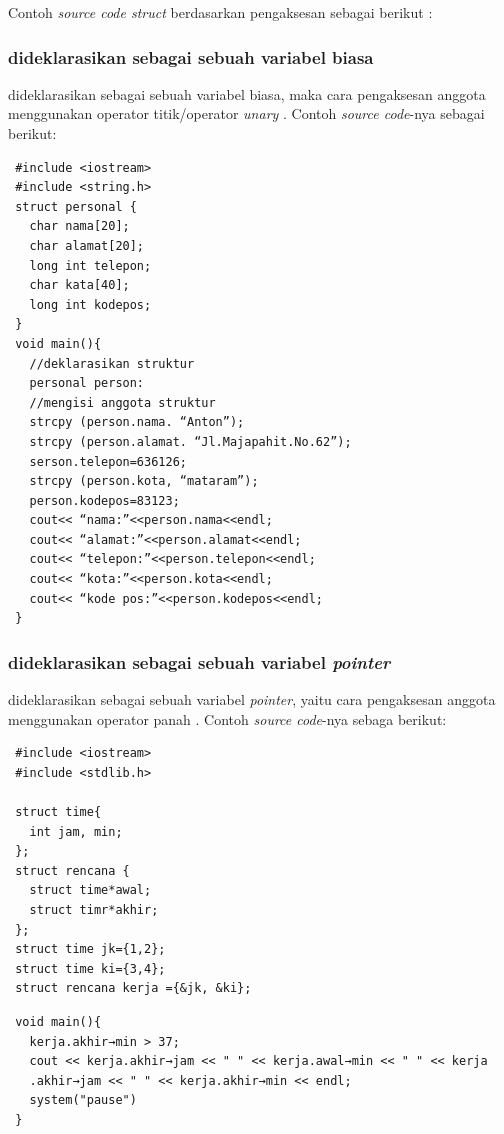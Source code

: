 \documentclass[../main.tex]{subfiles}
\begin{document}
    Contoh \textit{source code struct} berdasarkan pengaksesan sebagai berikut \parencite{munir2016algoritma}:

    \subsubsection{{\Struct} dideklarasikan sebagai sebuah variabel biasa}
    \begin{indentlevel0}
        {\Struct} dideklarasikan sebagai sebuah variabel biasa, maka cara pengaksesan anggota {\struct} menggunakan operator titik/operator \textit{unary} . Contoh \textit{source code}-nya sebagai berikut:
    \end{indentlevel0}

\vspace{-0.5ex}
\begin{indentlevel0}
\begin{lstlisting}
 #include <iostream>
 #include <string.h>
 struct personal {
   char nama[20];
   char alamat[20];
   long int telepon;
   char kata[40];
   long int kodepos;
 }
 void main(){
   //deklarasikan struktur
   personal person:
   //mengisi anggota struktur
   strcpy (person.nama. “Anton”);
   strcpy (person.alamat. “Jl.Majapahit.No.62”);
   serson.telepon=636126;
   strcpy (person.kota, “mataram”);
   person.kodepos=83123;
   cout<< “nama:”<<person.nama<<endl;
   cout<< “alamat:”<<person.alamat<<endl;
   cout<< “telepon:”<<person.telepon<<endl;
   cout<< “kota:”<<person.kota<<endl;
   cout<< “kode pos:”<<person.kodepos<<endl;
 }
\end{lstlisting}
\end{indentlevel0}

    \subsubsection{{\Struct} dideklarasikan sebagai sebuah variabel \textit{pointer}}
    \begin{indentlevel0}
        {\Struct} dideklarasikan sebagai sebuah variabel \textit{pointer}, yaitu cara pengaksesan anggota {\struct} menggunakan operator panah . Contoh \textit{source code}-nya sebaga berikut:
    \end{indentlevel0}
\vspace{-0.5ex}
\begin{indentlevel0}
\begin{lstlisting}
 #include <iostream>
 #include <stdlib.h>
 
 struct time{
   int jam, min;
 };
 struct rencana {
   struct time*awal;
   struct timr*akhir;
 };
 struct time jk={1,2};
 struct time ki={3,4};
 struct rencana kerja ={&jk, &ki};
\end{lstlisting}
\end{indentlevel0}
\begin{indentlevel0}
\begin{lstlisting}
 void main(){
   kerja.akhir→min > 37;
   cout << kerja.akhir→jam << " " << kerja.awal→min << " " << kerja
   .akhir→jam << " " << kerja.akhir→min << endl;
   system("pause")
 }
\end{lstlisting}
\end{indentlevel0}
\end{document}
